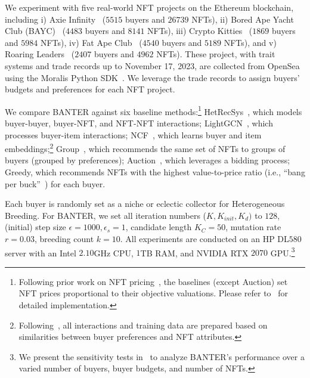 \documentclass[conference]{IEEEtran}
\theoremstyle{plain}
\begin{document}
    We experiment with five real-world NFT projects on the Ethereum blockchain, including i) Axie Infinity~\cite{axieinfinity} ($5515$ buyers and $26739$ NFTs), ii) Bored Ape Yacht Club (BAYC)~\cite{bayc} ($4483$ buyers and $8141$ NFTs), iii) Crypto Kitties~\cite{cryptokitties} ($1869$ buyers and $5984$ NFTs), iv) Fat Ape Club~\cite{fatape} ($4540$ buyers and $5189$ NFTs), and v) Roaring Leaders~\cite{roaringleader} ($2407$ buyers and $4962$ NFTs). These project, with trait systems and trade records up to November 17, 2023, are collected from OpenSea~\cite{opensea} using the Moralis Python SDK~\cite{moralis}. We leverage the trade records to assign buyers' budgets and preferences for each NFT project.

    We compare BANTER against six baseline methods:\footnote{Following prior work on NFT pricing~\cite{xiong2023pricing}, the baselines (except Auction) set NFT prices proportional to their objective valuations. Please refer to~\cite{supplementary} for detailed implementation.} HetRecSys~\cite{yang2021consisrec, kang2025unbiased}, which models buyer-buyer, buyer-NFT, and NFT-NFT interactions; LightGCN~\cite{he2020lightgcn, lee2024revisiting}, which processes buyer-item interactions; NCF~\cite{he2017neural}, which learns buyer and item embeddings;\footnote{Following~\cite{yang2021consisrec}, all interactions and training data are prepared based on similarities between buyer preferences and NFT attributes.} Group~\cite{guo2020group, zhou2024dual}, which recommends the same set of NFTs to groups of buyers (grouped by preferences); Auction~\cite{garg2004auction}, which leverages a bidding process; Greedy, which recommends NFTs with the highest value-to-price ratio (i.e., ``bang per buck''~\cite{devanur2008market}) for each buyer.

    Each buyer is randomly set as a niche or eclectic collector for Heterogeneous Breeding. For BANTER, we set all iteration numbers ($K, K_{init}, K_{d})$ to $128$, (initial) step size $\epsilon=1000, \epsilon_s=1$, candidate length $K_C=50$, mutation rate $r=0.03$, breeding count $k=10$. All experiments are conducted on an HP DL$580$ server with an Intel $2.10$GHz CPU, $1$TB RAM, and NVIDIA RTX $2070$ GPU.\footnote{We present the sensitivity tests in~\cite{supplementary} to analyze BANTER's performance over a varied number of buyers, buyer budgets, and number of NFTs.}
\end{document}
